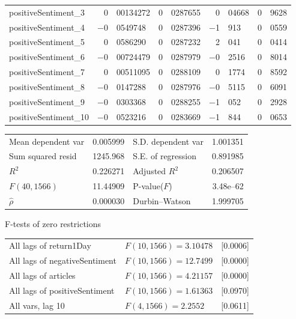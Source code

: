 \begin{center}
\begin{longtable}{lr@{.}lr@{.}lr@{.}lr@{.}l}
positiveSentiment\_3 &
    0&00134272 &
    0&0287655 &
        0&04668 &
        0&9628 \\
positiveSentiment\_4 &
    $-$0&0549748 &
    0&0287396 &
        $-$1&913 &
        0&0559 \\
positiveSentiment\_5 &
    0&0586290 &
    0&0287232 &
        2&041 &
        0&0414 \\
positiveSentiment\_6 &
    $-$0&00724479 &
    0&0287979 &
        $-$0&2516 &
        0&8014 \\
positiveSentiment\_7 &
    0&00511095 &
    0&0288109 &
        0&1774 &
        0&8592 \\
positiveSentiment\_8 &
    $-$0&0147288 &
    0&0287976 &
        $-$0&5115 &
        0&6091 \\
positiveSentiment\_9 &
    $-$0&0303368 &
    0&0288255 &
        $-$1&052 &
        0&2928 \\
positiveSentiment\_10 &
    $-$0&0523216 &
    0&0283669 &
        $-$1&844 &
        0&0653 \\
\end{longtable}

\begin{tabular}{lrlr}
Mean dependent var &  0.005999 & S.D. dependent var &  1.001351 \\
Sum squared resid &  1245.968 & S.E. of regression &  0.891985 \\
$R^2$ &  0.226271 & Adjusted $R^2$ &  0.206507 \\
$F(40, 1566)$ &  11.44909 & P-value($F$) &  3.48\textrm{e--62} \\
$\hat{\rho}$ &  0.000030 & Durbin--Watson &  1.999705 \\
\end{tabular}

\end{center}

\begin{center}
F-tests of zero restrictions\\[1em]
\begin{tabular}{lll}
All lags of return1Day & $F(10, 1566) = 3.10478$ & [0.0006]\\
All lags of negativeSentiment & $F(10, 1566) = 12.7499$ & [0.0000]\\
All lags of articles & $F(10, 1566) = 4.21157$ & [0.0000]\\
All lags of positiveSentiment & $F(10, 1566) = 1.61363$ & [0.0970]\\
All vars, lag 10 & $F(4, 1566) = 2.2552$ & [0.0611]\\
\end{tabular}
\end{center}

